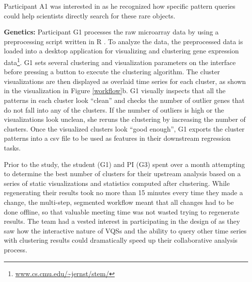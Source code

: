 Participant A1 was interested in \zv as he recognized how specific pattern queries could help scientists directly search for these rare objects. 

\par \textbf{Genetics:} Participant G1 processes the raw microarray data by using a preprocessing script written in R . To analyze the data, the preprocessed data is loaded into a desktop application for visualizing and clustering gene expression data\footnote{ \url{www.cs.cmu.edu/~jernst/stem/}}. G1 sets several clustering and visualization parameters on the interface before pressing a button to execute the clustering algorithm. The cluster visualizations are then displayed as overlaid time series for each cluster, as shown in the visualization in Figure \ref{workflow}b. G1 visually inspects that all the patterns in each cluster look ``clean'' and checks the number of outlier genes that do not fall into any of the clusters.  If the number of outliers is high or the visualizations look unclean, she reruns the clustering by increasing the number of clusters. Once the visualized clusters look ``good enough'', G1 exports the cluster patterns into a csv file to be used as features in their downstream regression tasks.
\par Prior to the study, the student (G1) and PI (G3) spent over a month attempting to determine the best number of clusters for their upstream analysis based on a series of static visualizations and statistics computed after clustering. While regenerating their results took no more than 15 minutes every time they made a change, the multi-step, segmented workflow meant that all changes had to be done offline, so that valuable meeting time was not wasted trying to regenerate results. The team had a vested interest in participating in the design of \zv as they saw how the interactive nature of VQSs and the ability to query other time series with clustering results could dramatically speed up their collaborative analysis process. 
